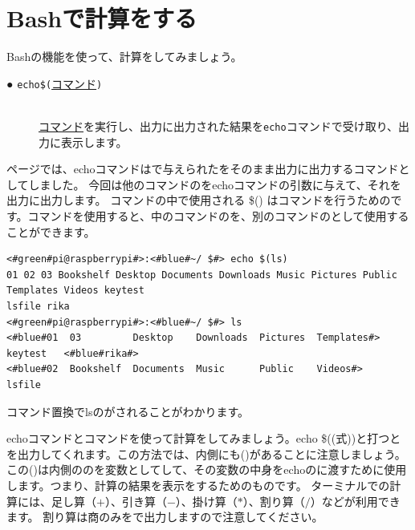 \documentclass[text03.tex]{subfiles}
\begin{document}
\newpage
\section{Bashで計算をする}

Bashの機能を使って、計算をしてみましょう。
\begin{description}
    \item[● \texttt{echo}\textvisiblespace\texttt{\$(}\underline{コマンド}\texttt{)}]\mbox{}\\
    \underline{コマンド}を実行し、出力に出力された結果を\texttt{echo}コマンドで受け取り、出力に表示します。
\end{description}

\pageref{cmd:echo}ページでは、echoコマンドはで与えられたをそのまま出力に出力するコマンドとしてしました。
今回は他のコマンドのをechoコマンドの引数に与えて、それを出力に出力します。
コマンドの中で使用される \$() はコマンドを行うためのです。コマンドを使用すると、中のコマンドのを、別のコマンドのとして使用することができます。
\begin{lstlisting}[caption=echo コマンド置換を使った例1, label=cmdsbs:echo]
<#green#pi@raspberrypi#>:<#blue#~/ $#> echo $(ls)
01 02 03 Bookshelf Desktop Documents Downloads Music Pictures Public Templates Videos keytest
lsfile rika
<#green#pi@raspberrypi#>:<#blue#~/ $#> ls
<#blue#01  03         Desktop    Downloads  Pictures  Templates#>   keytest   <#blue#rika#>
<#blue#02  Bookshelf  Documents  Music      Public    Videos#>      lsfile
\end{lstlisting}
コマンド置換でlsのがされることがわかります。

echoコマンドとコマンドを使って計算をしてみましょう。echo \$((式))と打つとを出力してくれます。この方法では、内側にも()があることに注意しましょう。この()は内側ののを変数としてして、その変数の中身をechoのに渡すために使用します。つまり、計算の結果を表示をするためのものです。
ターミナルでの計算には、足し算（$+$）、引き算（$-$）、掛け算（$*$）、割り算（$/$）などが利用できます。 割り算は商のみをで出力しますので注意してください。
\end{document}
